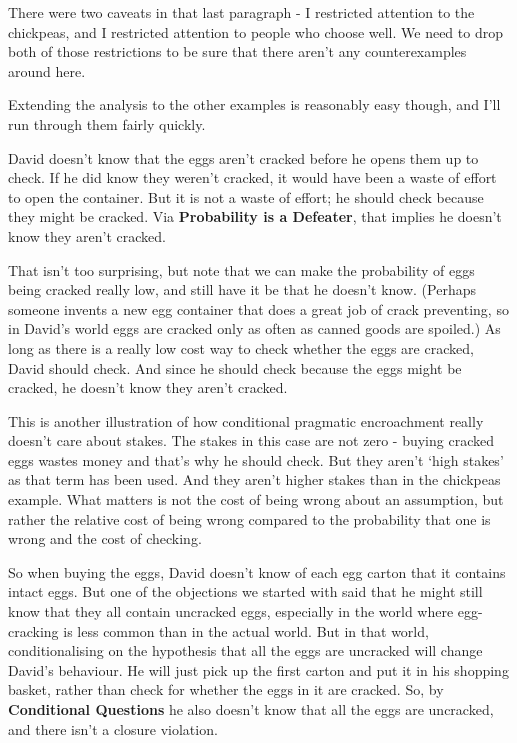 \documentclass[11pt,]{book}
\begin{document}
There were two caveats in that last paragraph - I restricted attention to the chickpeas, and I restricted attention to people who choose well. We need to drop both of those restrictions to be sure that there aren't any counterexamples around here.

Extending the analysis to the other examples is reasonably easy though, and I'll run through them fairly quickly.

David doesn't know that the eggs aren't cracked before he opens them up to check. If he did know they weren't cracked, it would have been a waste of effort to open the container. But it is not a waste of effort; he should check because they might be cracked. Via \textbf{Probability is a Defeater}, that implies he doesn't know they aren't cracked.

That isn't too surprising, but note that we can make the probability of eggs being cracked really low, and still have it be that he doesn't know. (Perhaps someone invents a new egg container that does a great job of crack preventing, so in David's world eggs are cracked only as often as canned goods are spoiled.) As long as there is a really low cost way to check whether the eggs are cracked, David should check. And since he should check because the eggs might be cracked, he doesn't know they aren't cracked.

This is another illustration of how conditional pragmatic encroachment really doesn't care about stakes. The stakes in this case are not zero - buying cracked eggs wastes money and that's why he should check. But they aren't `high stakes' as that term has been used. And they aren't higher stakes than in the chickpeas example. What matters is not the cost of being wrong about an assumption, but rather the relative cost of being wrong compared to the probability that one is wrong and the cost of checking.

So when buying the eggs, David doesn't know of each egg carton that it contains intact eggs. But one of the objections we started with said that he might still know that they all contain uncracked eggs, especially in the world where egg-cracking is less common than in the actual world. But in that world, conditionalising on the hypothesis that all the eggs are uncracked will change David's behaviour. He will just pick up the first carton and put it in his shopping basket, rather than check for whether the eggs in it are cracked. So, by \textbf{Conditional Questions} he also doesn't know that all the eggs are uncracked, and there isn't a closure violation.
\end{document}
